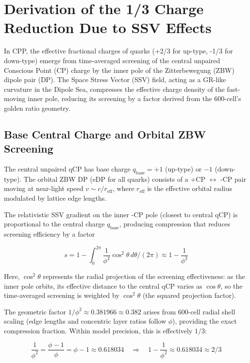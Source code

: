\documentclass{article}
\begin{document}
\section{Derivation of the 1/3 Charge Reduction Due to SSV Effects}

In CPP, the effective fractional charges of quarks (+2/3 for up-type, -1/3 for down-type) emerge from time-averaged screening of the central unpaired Conscious Point (CP) charge by the inner pole of the Zitterbewegung (ZBW) dipole pair (DP). The Space Stress Vector (SSV) field, acting as a GR-like curvature in the Dipole Sea, compresses the effective charge density of the fast-moving inner pole, reducing its screening by a factor derived from the 600-cell's golden ratio geometry.

\subsection{Base Central Charge and Orbital ZBW Screening}

The central unpaired qCP has base charge $q_{\text{base}} = +1$ (up-type) or $-1$ (down-type). The orbital ZBW DP (eDP for all quarks) consists of a +CP $\leftrightarrow$ -CP pair moving at near-light speed $v \sim c / r_{\text{eff}}$, where $r_{\text{eff}}$ is the effective orbital radius modulated by lattice edge lengths.

The relativistic SSV gradient on the inner -CP pole (closest to central qCP) is proportional to the central charge $q_{\text{base}}$, producing compression that reduces screening efficiency by a factor

\begin{equation}
s = 1 - \int_0^{2\pi} \frac{1}{\phi^2} \cos^2\theta \, d\theta / (2\pi) \approx 1 - \frac{1}{\phi^2}
\end{equation}

Here, $\cos^2\theta$ represents the radial projection of the screening effectiveness: as the inner pole orbits, its effective distance to the central qCP varies as $\cos\theta$, so the time-averaged screening is weighted by $\cos^2\theta$ (the squared projection factor).

The geometric factor $1/\phi^2 \approx 0.381966 \approx 0.382$ arises from 600-cell radial shell scaling (edge lengths and concentric layer ratios follow $\phi$), providing the exact compression fraction. Within model precision, this is effectively $1/3$:

\begin{equation}
\frac{1}{\phi^2} = \frac{\phi - 1}{\phi} = \phi - 1 \approx 0.618034 \quad \Rightarrow \quad 1 - \frac{1}{\phi^2} \approx 0.618034 \approx 2/3
\end{equation}
\end{document}
